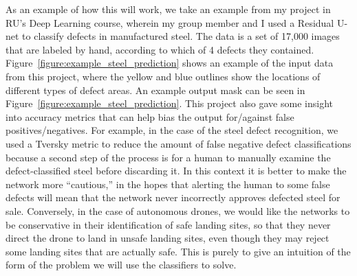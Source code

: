 As an example of how this will work, we take an example from my project in RU's Deep Learning
course, wherein my group member and I used a Residual U-net to classify defects
in manufactured steel.
The data is a set of 17,000 images that are labeled by hand, according to which of 4 defects they contained.
Figure~\ref{figure:example_steel_prediction} shows an example of the input data from this project,
where the yellow and blue outlines show the locations of different types of defect areas.
An example output mask can be seen in Figure~\ref{figure:example_steel_prediction}.
This project also gave some insight into accuracy metrics that can help bias the output
for/against false positives/negatives.
For example, in the case of the steel defect recognition, we used a Tversky metric to
reduce the amount of false negative defect classifications because a second step of the
process is for a human to manually examine the defect-classified steel before discarding it.
In this context it is better to make the network more ``cautious,'' in the hopes that
alerting the human to some false defects will mean that the network never incorrectly approves
defected steel for sale.
Conversely, in the case of autonomous drones,
we would like the networks to be conservative in their identification of safe landing sites,
so that they never direct the drone to land in unsafe landing sites, even though they may reject
some landing sites that are actually safe.
This is purely to give an intuition of the form of the problem we will use the classifiers to solve.

